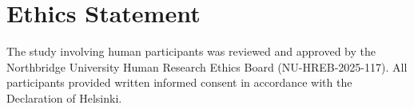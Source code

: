 \section{Ethics Statement}

The study involving human participants was reviewed and approved by the Northbridge University Human Research Ethics Board (NU-HREB-2025-117). All participants provided written informed consent in accordance with the Declaration of Helsinki.
